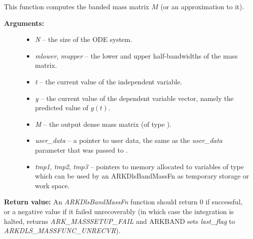 \documentclass[letterpaper,10pt,english]{sphinxmanual}
\begin{document}
\begin{fulllineitems}
\label{c_interface/User_supplied:ARKDlsBandMassFn}
This function computes the banded mass matrix $M$ (or an approximation to it).
\begin{description}
\item[{\textbf{Arguments:}}] \leavevmode\begin{itemize}
\item {} 
\emph{N} -- the size of the ODE system.

\item {} 
\emph{mlower}, \emph{mupper} -- the lower and upper half-bandwidths of
the mass matrix.

\item {} 
\emph{t} -- the current value of the independent variable.

\item {} 
\emph{y} -- the current value of the dependent variable vector, namely
the predicted value of $y(t)$.

\item {} 
\emph{M} -- the output dense mass matrix (of type ).

\item {} 
\emph{user\_data} -- a pointer to user data, the same as the
\emph{user\_data} parameter that was passed to {\hyperref[c_interface/User_callable:ARKodeSetUserData]{}}.

\item {} 
\emph{tmp1}, \emph{tmp2}, \emph{tmp3} -- pointers to memory allocated to
variables of type  which can be used by an
ARKDlsBandMassFn as temporary storage or work space.

\end{itemize}

\end{description}

\textbf{Return value:}
An \emph{ARKDlsBandMassFn} function should return 0 if
successful, or a negative value if it failed unrecoverably (in
which case the integration is halted, {\hyperref[c_interface/User_callable:ARKode]{}} returns
\emph{ARK\_MASSSETUP\_FAIL} and ARKBAND sets \emph{last\_flag} to
\emph{ARKDLS\_MASSFUNC\_UNRECVR}).


\end{fulllineitems}
\end{document}
